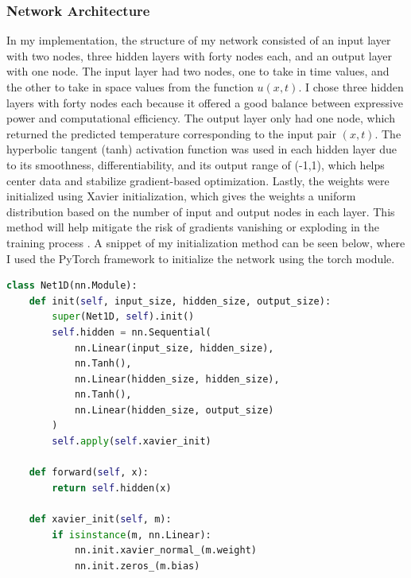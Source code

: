 \documentclass[12pt, reqno]{amsart}
\begin{document}
\subsubsection{Network Architecture}
In my implementation, the structure of my network consisted of an input layer with two nodes, three hidden layers with forty nodes each, and an output layer with one node. The input layer had two nodes, one to take in time values, and the other to take in space values from the function $u(x,t)$. I chose three hidden layers with forty nodes each because it offered a good balance between expressive power and computational efficiency. The output layer only had one node, which returned the predicted temperature corresponding to the input pair $(x,t)$. The hyperbolic tangent (tanh) activation function was used in each hidden layer due to its smoothness, differentiability, and its output range of (-1,1), which helps center data and stabilize gradient-based optimization. Lastly, the weights were initialized using Xavier initialization, which gives the weights a uniform distribution based on the number of input and output nodes in each layer. This method will help mitigate the risk of gradients vanishing or exploding in the training process \cite{4}. A snippet of my initialization method can be seen below, where I used the PyTorch framework to initialize the network using the torch module.
\begin{lstlisting}[language=Python, title = PINN Initialization]
class Net1D(nn.Module):
    def init(self, input_size, hidden_size, output_size):
        super(Net1D, self).init()
        self.hidden = nn.Sequential(
            nn.Linear(input_size, hidden_size),
            nn.Tanh(),
            nn.Linear(hidden_size, hidden_size),
            nn.Tanh(),
            nn.Linear(hidden_size, output_size)
        )
        self.apply(self.xavier_init)

    def forward(self, x):
        return self.hidden(x)

    def xavier_init(self, m):
        if isinstance(m, nn.Linear):
            nn.init.xavier_normal_(m.weight)
            nn.init.zeros_(m.bias)
\end{lstlisting}
\end{document}
